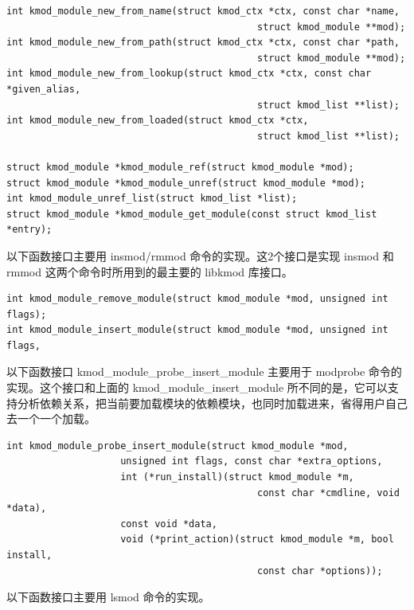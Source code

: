 \documentclass[11pt,a4paper]{article}
\begin{document}
{\begin{shaded}\begin{verbatim}
int kmod_module_new_from_name(struct kmod_ctx *ctx, const char *name,
                                            struct kmod_module **mod);
int kmod_module_new_from_path(struct kmod_ctx *ctx, const char *path,
                                            struct kmod_module **mod);
int kmod_module_new_from_lookup(struct kmod_ctx *ctx, const char *given_alias,
                                            struct kmod_list **list);
int kmod_module_new_from_loaded(struct kmod_ctx *ctx,
                                            struct kmod_list **list);

struct kmod_module *kmod_module_ref(struct kmod_module *mod);
struct kmod_module *kmod_module_unref(struct kmod_module *mod);
int kmod_module_unref_list(struct kmod_list *list);
struct kmod_module *kmod_module_get_module(const struct kmod_list *entry);
\end{verbatim}\end{shaded}}
以下函数接口主要用 insmod/rmmod 命令的实现。这2个接口是实现 insmod 和
rmmod 这两个命令时所用到的最主要的 libkmod 库接口。

{\begin{shaded}\begin{verbatim}
int kmod_module_remove_module(struct kmod_module *mod, unsigned int flags);
int kmod_module_insert_module(struct kmod_module *mod, unsigned int flags,
\end{verbatim}\end{shaded}}
以下函数接口 kmod\_module\_probe\_insert\_module 主要用于 modprobe
命令的实现。这个接口和上面的 kmod\_module\_insert\_module
所不同的是，它可以支持分析依赖关系，把当前要加载模块的依赖模块，也同时加载进来，省得用户自己去一个一个加载。

{\begin{shaded}\begin{verbatim}
int kmod_module_probe_insert_module(struct kmod_module *mod,
                    unsigned int flags, const char *extra_options,
                    int (*run_install)(struct kmod_module *m,
                                            const char *cmdline, void *data),
                    const void *data,
                    void (*print_action)(struct kmod_module *m, bool install,
                                            const char *options));
\end{verbatim}\end{shaded}}
以下函数接口主要用 lsmod 命令的实现。
\end{document}
